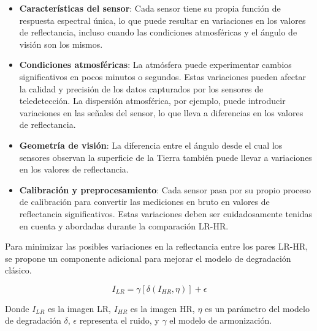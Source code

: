 \begin{itemize}
    \item \textbf{Características del sensor}: Cada sensor tiene su propia función de respuesta espectral única, lo que puede resultar en variaciones en los valores de reflectancia, incluso cuando las condiciones atmosféricas y el ángulo de visión son los mismos.

    \item \textbf{Condiciones atmosféricas}: La atmósfera puede experimentar cambios significativos en pocos minutos o segundos. Estas variaciones pueden afectar la calidad y precisión de los datos capturados por los sensores de teledetección. La dispersión atmosférica, por ejemplo, puede introducir variaciones en las señales del sensor, lo que lleva a diferencias en los valores de reflectancia.

    \item \textbf{Geometría de visión}: La diferencia entre el ángulo desde el cual los sensores observan la superficie de la Tierra también puede llevar a variaciones en los valores de reflectancia.

    \item \textbf{Calibración y preprocesamiento}: Cada sensor pasa por su propio proceso de calibración para convertir las mediciones en bruto en valores de reflectancia significativos. Estas variaciones deben ser cuidadosamente tenidas en cuenta y abordadas durante la comparación LR-HR.
    
\end{itemize}

Para minimizar las posibles variaciones en la reflectancia entre los pares LR-HR, se propone un componente adicional para mejorar el modelo de degradación clásico.

\begin{equation}
    I_{LR} = \gamma[\delta(I_{HR}, \eta)] + \epsilon
\end{equation}

Donde $I_{LR}$ es la imagen LR, $I_{HR}$ es la imagen HR, $\eta$ es un parámetro del modelo de degradación $\delta$, $\epsilon$ representa el ruido, y $\gamma$ el modelo de armonización.